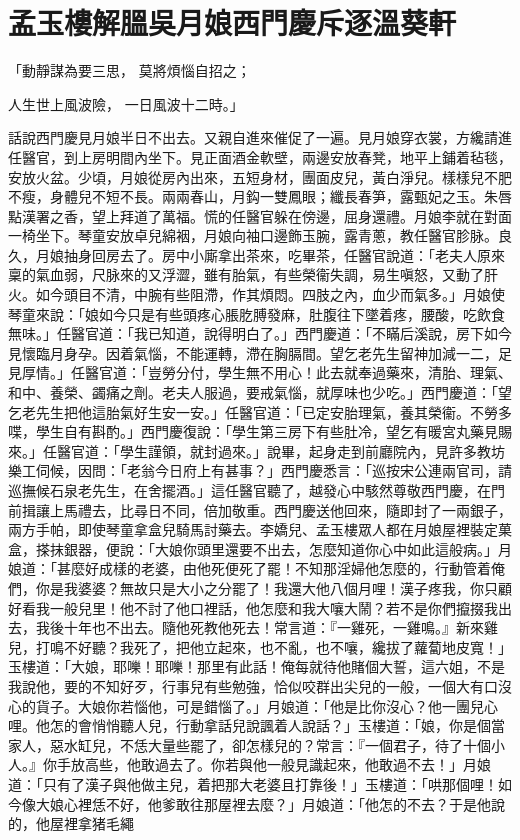%

\chapter{孟玉樓解膃吳月娘\KG 西門慶斥逐溫葵軒}


\begin{showcontents}{}




「動靜謀為要三思，  莫將煩惱自招之；

人生世上風波險，  一日風波十二時。」

話說西門慶見月娘半日不出去。又親自進來催促了一遍。見月娘穿衣裳，方纔請進任醫官，到上房明間內坐下。見正面酒金軟壁，兩邊安放春凳，地平上鋪着毡毯，安放火盆。少頃，月娘從房內出來，五短身材，團面皮兒，黃白淨兒。樣樣兒不肥不瘦，身體兒不短不長。兩兩春山，月鈎一雙鳳眼；纖長春笋，露甄妃之玉。朱唇點漢署之香，望上拜道了萬福。慌的任醫官躲在傍邊，屈身還禮。月娘李就在對面一椅坐下。琴童安放卓兒綿裀，月娘向袖口邊飾玉腕，露青蔥，教任醫官胗脉。良久，月娘抽身回房去了。房中小廝拿出茶來，吃畢茶，任醫官說道：「老夫人原來稟的氣血弱，尺脉來的又浮澀，雖有胎氣，有些榮衞失調，易生嗔怒，又動了肝火。如今頭目不清，中腕有些阻滯，作其煩悶。四肢之內，血少而氣多。」月娘使琴童來說：「娘如今只是有些頭疼心脹肐膊發麻，肚腹往下墜着疼，腰酸，吃飲食無味。」任醫官道：「我已知道，說得明白了。」西門慶道：「不瞞后溪說，房下如今見懷臨月身孕。因着氣惱，不能運轉，滯在胸膈間。望乞老先生留神加減一二，足見厚情。」任醫官道：「豈勞分付，學生無不用心！此去就奉過藥來，清胎、理氣、和中、養榮、蠲痛之劑。老夫人服過，要戒氣惱，就厚味也少吃。」西門慶道：「望乞老先生把他這胎氣好生安一安。」任醫官道：「已定安胎理氣，養其榮衞。不勞多喋，學生自有斟酌。」西門慶復說：「學生第三房下有些肚冷，望乞有暖宮丸藥見賜來。」任醫官道：「學生謹領，就封過來。」說畢，起身走到前廳院內，見許多教坊樂工伺候，因問：「老翁今日府上有甚事？」西門慶悉言：「巡按宋公連兩官司，請巡撫候石泉老先生，在舍擺酒。」這任醫官聽了，越發心中駭然尊敬西門慶，在門前揖讓上馬禮去，比尋日不同，倍加敬重。西門慶送他回來，隨即封了一兩銀子，兩方手帕，即使琴童拿盒兒騎馬討藥去。李嬌兒、孟玉樓眾人都在月娘屋裡裝定菓盒，搽抹銀器，便說：「大娘你頭里還要不出去，怎麼知道你心中如此這般病。」月娘道：「甚麼好成樣的老婆，由他死便死了罷！不知那淫婦他怎麼的，行動管着俺們，你是我婆婆？無故只是大小之分罷了！我還大他八個月哩！漢子疼我，你只顧好看我一般兒里！他不討了他口裡話，他怎麼和我大嚷大鬧？若不是你們攛掇我出去，我後十年也不出去。隨他死教他死去！常言道：『一雞死，一雞鳴。』新來雞兒，打鳴不好聽？我死了，把他立起來，也不亂，也不嚷，纔拔了蘿蔔地皮寬！」玉樓道：「大娘，耶嚛！耶嚛！那里有此話！俺每就待他賭個大誓，這六姐，不是我說他，要的不知好歹，行事兒有些勉強，恰似咬群出尖兒的一般，一個大有口沒心的貨子。大娘你若惱他，可是錯惱了。」月娘道：「他是比你沒心？他一團兒心哩。他怎的會悄悄聽人兒，行動拿話兒說諷着人說話？」玉樓道：「娘，你是個當家人，惡水缸兒，不恁大量些罷了，卻怎樣兒的？常言：『一個君子，待了十個小人。』你手放高些，他敢過去了。你若與他一般見識起來，他敢過不去！」月娘道：「只有了漢子與他做主兒，着把那大老婆且打靠後！」玉樓道：「哄那個哩！如今像大娘心裡恁不好，他爹敢往那屋裡去麼？」月娘道：「他怎的不去？于是他說的，他屋裡拿猪毛繩
\end{showcontents}
